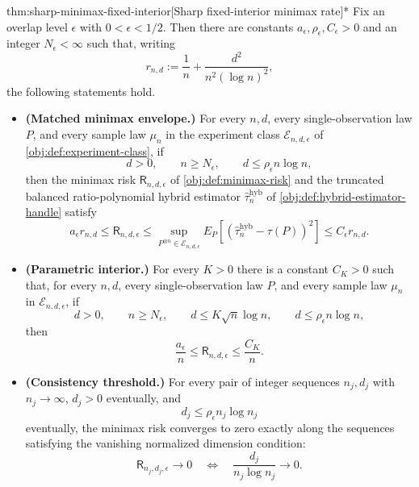 \documentclass[11pt]{article}
\begin{document}
\begin{theoremv}{thm:sharp-minimax-fixed-interior}[Sharp fixed-interior minimax rate]*
Fix an overlap level \(\epsilon\) with \(0<\epsilon<1/2\).  Then there are constants
\(a_\epsilon,\rho_\epsilon,C_\epsilon>0\) and an integer \(N_\epsilon<\infty\) such that, writing
\[
r_{n,d}:=\frac1n+\frac{d^2}{n^2(\log n)^2},
\]
the following statements hold.
\begin{itemize}
\item \textbf{(Matched minimax envelope.)} For every \(n,d\), every single-observation law \(P\), and every sample law \(\mu_n\) in the experiment class \(\mathcal E_{n,d,\epsilon}\) of \cref{obj:def:experiment-class}, if
\[
d>0,\qquad n\ge N_\epsilon,\qquad d\le \rho_\epsilon n\log n,
\]
then the minimax risk \(\mathsf R_{n,d,\epsilon}\) of \cref{obj:def:minimax-risk} and the truncated balanced ratio-polynomial hybrid estimator \(\widehat\tau_n^{\mathrm{hyb}}\) of \cref{obj:def:hybrid-estimator-handle} satisfy
\[
a_\epsilon r_{n,d}
\le
\mathsf R_{n,d,\epsilon}
\le
\sup_{P^{\otimes n}\in\mathcal E_{n,d,\epsilon}}
E_P\!\left[\left(\widehat\tau_n^{\mathrm{hyb}}-\tau(P)\right)^2\right]
\le
C_\epsilon r_{n,d}.
\]
\item \textbf{(Parametric interior.)} For every \(K>0\) there is a constant \(C_K>0\) such that, for every \(n,d\), every single-observation law \(P\), and every sample law \(\mu_n\) in \(\mathcal E_{n,d,\epsilon}\), if
\[
d>0,\qquad n\ge N_\epsilon,\qquad
d\le K\sqrt n\log n,\qquad
d\le \rho_\epsilon n\log n,
\]
then
\[
\frac{a_\epsilon}{n}
\le
\mathsf R_{n,d,\epsilon}
\le
\frac{C_K}{n}.
\]
\item \textbf{(Consistency threshold.)} For every pair of integer sequences \(n_j,d_j\) with \(n_j\to\infty\), \(d_j>0\) eventually, and
\[
d_j\le \rho_\epsilon n_j\log n_j
\]
eventually, the minimax risk converges to zero exactly along the sequences satisfying the vanishing normalized dimension condition:
\[
\mathsf R_{n_j,d_j,\epsilon}\to 0
\quad\Longleftrightarrow\quad
\frac{d_j}{n_j\log n_j}\to 0.
\]
\end{itemize}
\end{theoremv}
\end{document}
